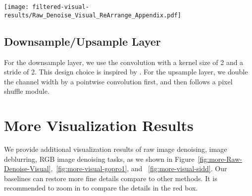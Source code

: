 \documentclass[runningheads]{llncs}
\begin{document}
\begin{figure*}[!t]
\texttt{[image: filtered-visual-results/Raw\_Denoise\_Visual\_ReArrange\_Appendix.pdf]}
\caption{Additional qualitatively comparison of raw image denoising results with PMRID\cite{wang2020practical}. Zoom in to see details}
\label{fig:more-Raw-Denoise-Visual}
\end{figure*}


\subsection{Downsample/Upsample Layer}
For the downsample layer, we use the convolution with a kernel size of 2 and a stride of 2. This design choice is inspired by \cite{alsallakh2020mind}. 
For the upsample layer, we double the channel width by a pointwise convolution first, and then follows a pixel shuffle module\cite{shi2016real}.






\section{More Visualization Results}
We provide additional visualization results of raw image denoising, image deblurring, RGB image denoising tasks, as we shown in Figure~\ref{fig:more-Raw-Denoise-Visual},~\ref{fig:more-visual-gopro1}, and ~\ref{fig:more-visual-sidd}. Our baselines can restore more fine details compare to other methods. It is recommended to zoom in to compare the details in the red box.
\end{document}
